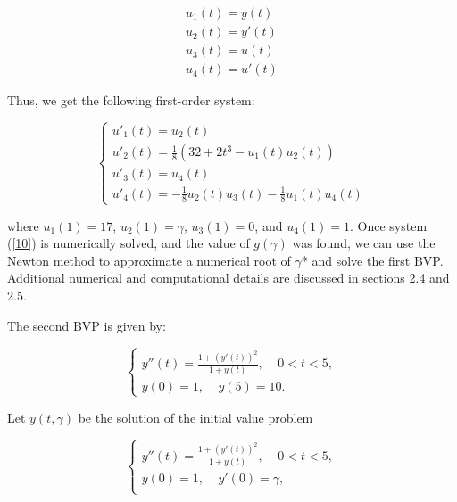 \documentclass{article}
\begin{document}
\begin{equation}\label{9}
    \begin{aligned}
        u_1(t)=y(t)\\
        u_2(t)=y'(t)\\
        u_3(t)=u(t)\\
        u_4(t)=u'(t)
    \end{aligned}
\end{equation}

Thus, we get the following first-order system:

\begin{equation}\label{10}
    \begin{cases}
        u'_1(t)=u_2(t)\\
        u'_2(t)=\frac{1}{8}(32+2t^3-u_1(t)u_2(t))\\
        u'_3(t)=u_4(t)\\
        u'_4(t)=-\frac{1}{8}u_2(t)u_3(t) -\frac{1}{8}u_1(t)u_4(t)
    \end{cases}
\end{equation}

where $u_1(1)=17$, $u_2(1)=\gamma$, $u_3(1)=0$, and $u_4(1)=1$. Once system (\ref{10}) is numerically solved, and the value of $g(\gamma)$ was found, we can use the Newton method to approximate a numerical root of $\gamma$* and solve the first BVP. Additional numerical and computational details are discussed in sections 2.4 and 2.5.

\newpage

The second BVP is given by: 

\begin{equation}\label{11}
    \begin{cases}
        y''(t)=\frac{1+(y'(t))^2}{1+y(t)}, \ \ \ \ \  0<t<5, \\
        y(0)=1, \ \ \ \ \ y(5)=10.
    \end{cases}
\end{equation} 

Let $y(t,\gamma)$ be the solution of the initial value problem

\begin{equation}\label{12}
    \begin{cases}
      y''(t)=\frac{1+(y'(t))^2}{1+y(t)}, \ \ \ \ \  0<t<5, \\
        y(0)=1, \ \ \ \ \ y'(0)=\gamma ,\\
    \end{cases}
\end{equation}
\end{document}
